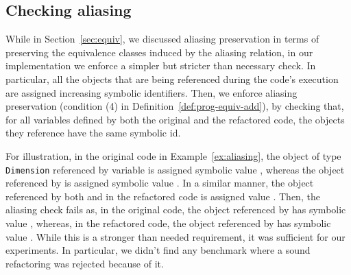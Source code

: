 \documentclass[sigconf]{acmart}
\begin{document}










\subsection{Checking aliasing}

While in Section~\ref{sec:equiv}, we discussed aliasing preservation in terms of
preserving the equivalence classes induced by the aliasing relation,
in our implementation we enforce a simpler but stricter  than necessary check.
In particular, all the objects
that are being referenced during the code's execution
are assigned increasing symbolic identifiers.
Then, we enforce aliasing preservation (condition (4) in Definition~\ref{def:prog-equiv-add}),
by checking that, for all variables defined by both the original and the refactored code,
the objects they reference have the same symbolic id.

For illustration, in the original code in Example~\ref{ex:aliasing}, the object of type \lstinline[breaklines=true]{Dimension} referenced by variable 
is assigned symbolic value , whereas the object referenced by  is assigned symbolic value .
In a similar manner, the object referenced by both  and  in the refactored code is assigned value .
Then, the aliasing check fails as, in the original code, the object referenced by  has symbolic value ,
whereas, in the refactored code, the object referenced by  has symbolic value .
%
While this is a  stronger than needed requirement, it was sufficient for our experiments.
In particular, we didn't find any benchmark where a sound refactoring
was rejected because of it.
\end{document}
